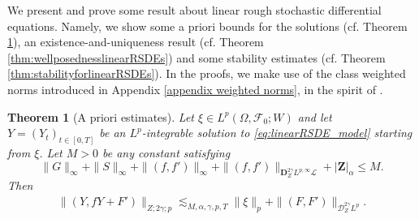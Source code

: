 \documentclass[11pt,a4paper]{article}
\theoremstyle{plain}
\newtheorem{thm}[defn]{Theorem}
\begin{document}
We present and prove some result about linear rough stochastic differential equations. Namely, we show some a priori bounds for the solutions (cf. Theorem \ref{thm:aprioriestimatelinearRSDEs}), an existence-and-uniqueness result (cf. Theorem \ref{thm:wellposednesslinearRSDEs}) and some stability estimates (cf. Theorem \ref{thm:stabilityforlinearRSDEs}). In the proofs, we make use of the class weighted norms introduced in Appendix \ref{appendix weighted norms}, in the spirit of \cite{bailleul2017unbounded}. 

\begin{thm}[A priori estimates] \label{thm:aprioriestimatelinearRSDEs} Let $\xi \in L^p(\Omega,\mathcal{F}_0;W)$ and let $Y=(Y_t)_{t \in [0,T]}$ be an $L^p$-integrable solution to \eqref{eq:linearRSDE_model} starting from $\xi$. Let $M>0$ be any constant satisfying \begin{equation*} \label{eq:constantMinaprioriestimatesforlinearRSDEs}
    \|G\|_\infty + \|S\|_\infty + \|(f,f')\|_\infty + \|(f,f')\|_{\mathbf{D}_Z^{2\gamma}L^{p,\infty
    }\mathscr{L}} + |\mathbf{Z}|_\alpha  \le M.
\end{equation*} 
Then 
\begin{align*}
        \|(Y,fY+F')\|_{Z;2\gamma;p} \lesssim_{M,\alpha,\gamma,p,T} \|\xi\|_p + \|(F,F')\|_{\mathscr{D}^{2\gamma}_ZL^{p}}.
    \end{align*} 
\end{thm}
\end{document}
